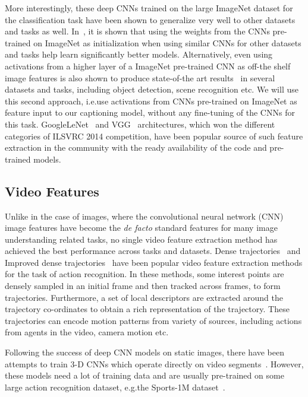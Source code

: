More interestingly, these deep CNNs trained on the large ImageNet dataset for
the classification task have been shown to generalize very well to other
datasets and tasks as well.
In~\cite{yosinski2014transferable}, it is shown that using the weights from the
CNNs pre-trained on ImageNet as initialization when using similar CNNs for other
datasets and tasks help learn significantly better models.
Alternatively, even using activations from a higher layer of a ImageNet
pre-trained CNN as off-the shelf image features is also shown to produce
state-of-the art results~\cite{Donahue2014,Razavian2014CVPR} in several datasets
and tasks, including object detection, scene recognition etc.
We will use this second approach, i.e.\@ use activations from CNNs pre-trained
on ImageNet as feature input to our captioning model, without any fine-tuning of
the CNNs for this task.
GoogleLeNet~\cite{DBLP:journals/corr/SzegedyLJSRAEVR14} and
VGG~\cite{Simonyan14c} architectures, which won the different categories of
ILSVRC 2014 competition, have been popular source of such feature extraction in
the community with the ready availability of the code and pre-trained models.

\subsection{Video Features}
Unlike in the case of images, where the convolutional neural network (CNN) image
features have become the \emph{de facto} standard features for many image
understanding related tasks, no single video feature extraction method has
achieved the best performance across tasks and datasets.
Dense trajectories~\cite{DBLP:conf/cvpr/WangKSL11} and Improved dense
trajectories~\cite{Wang2013} have been popular video feature extraction methods
for the task of action recognition.
In these methods, some interest points are densely sampled in an initial frame
and then tracked across frames, to form trajectories.
Furthermore, a set of local descriptors are extracted around the trajectory
co-ordinates to obtain a rich representation of the trajectory.
These trajectories can encode motion patterns from variety of sources, including
actions from agents in the video, camera motion etc.

Following the success of deep CNN models on static images, there have been
attempts to train 3-D CNNs which operate directly on video
segments~\cite{3dCNN_ji2013, KarpathyCVPR14, DBLP:C3D}.
However, these models need a lot of training data and are usually pre-trained on
some large action recognition dataset, e.g.\@ the Sports-1M
dataset~\cite{KarpathyCVPR14}.

